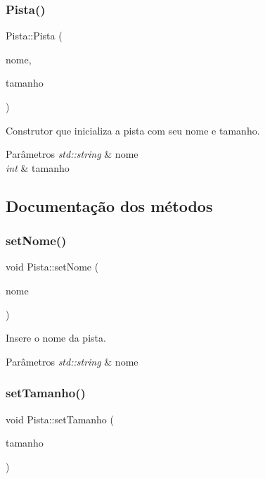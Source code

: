 \subsubsection{\texorpdfstring{Pista()}{Pista()}}
{\footnotesize\ttfamily Pista\+::\+Pista (\begin{DoxyParamCaption}\item[{std\+::string}]{nome,  }\item[{int}]{tamanho }\end{DoxyParamCaption})}



Construtor que inicializa a pista com seu nome e tamanho. 


\begin{DoxyParams}{Parâmetros}
{\em std\+::string} & nome \\
\hline
{\em int} & tamanho \\
\hline
\end{DoxyParams}


\subsection{Documentação dos métodos}
\mbox{\label{classPista_ad0c553cfa88f083810eb6259e328df7b}} 
\subsubsection{\texorpdfstring{set\+Nome()}{setNome()}}
{\footnotesize\ttfamily void Pista\+::set\+Nome (\begin{DoxyParamCaption}\item[{std\+::string}]{nome }\end{DoxyParamCaption})}



Insere o nome da pista. 


\begin{DoxyParams}{Parâmetros}
{\em std\+::string} & nome \\
\hline
\end{DoxyParams}
\mbox{\label{classPista_a08d26ad19e300462d05208e6e15b56e7}} 
\subsubsection{\texorpdfstring{set\+Tamanho()}{setTamanho()}}
{\footnotesize\ttfamily void Pista\+::set\+Tamanho (\begin{DoxyParamCaption}\item[{int}]{tamanho }\end{DoxyParamCaption})}



